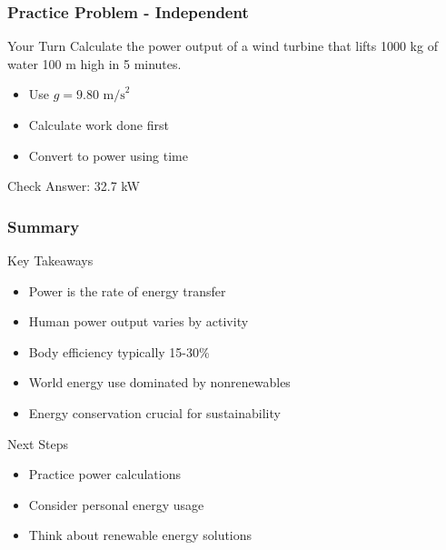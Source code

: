 \documentclass{beamer}
\begin{document}
\begin{frame}
\frametitle{Practice Problem - Independent}
\begin{block}{Your Turn}
Calculate the power output of a wind turbine that lifts 1000 kg of water 100 m high in 5 minutes.
\begin{itemize}
\item Use $g = 9.80\text{ m/s}^2$
\item Calculate work done first
\item Convert to power using time
\end{itemize}
\end{block}

\pause

\begin{block}{Check}
Answer: 32.7 kW
\end{block}
\end{frame}

\begin{frame}
\frametitle{Summary}
\begin{block}{Key Takeaways}
\begin{itemize}
\item Power is the rate of energy transfer
\item Human power output varies by activity
\item Body efficiency typically 15-30\%
\item World energy use dominated by nonrenewables
\item Energy conservation crucial for sustainability
\end{itemize}
\end{block}
\begin{block}{Next Steps}
\begin{itemize}
\item Practice power calculations
\item Consider personal energy usage
\item Think about renewable energy solutions
\end{itemize}
\end{block}
\end{frame}
\end{document}
